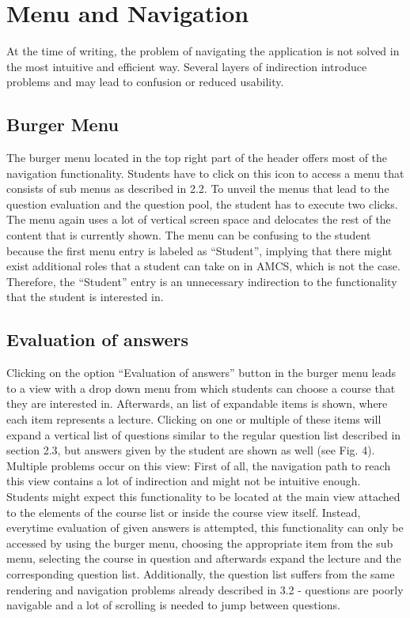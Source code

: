 \section{Menu and Navigation}

At the time of writing, the problem of navigating the application is not solved in the most intuitive and efficient way. Several layers of indirection introduce problems and may lead to confusion or reduced usability.

\subsection{Burger Menu}

The burger menu located in the top right part of the header offers most of the navigation functionality. Students have to click on this icon to access a menu that consists of sub menus as described in 2.2. To unveil the menus that lead to the question evaluation and the question pool, the student has to execute two clicks. The menu again uses a lot of vertical screen space and delocates the rest of the content that is currently shown.
The menu can be confusing to the student because the first menu entry is labeled as “Student”, implying that there might exist additional roles that a student can take on in AMCS, which is not the case. Therefore, the “Student” entry is an unnecessary indirection to the functionality that the student is interested in.

\subsection{Evaluation of answers}

Clicking on the option “Evaluation of answers” button in the burger menu leads to a view with a drop down menu from which students can choose a course that they are interested in. Afterwards, an list of expandable items is shown, where each item represents a lecture. Clicking on one or multiple of these items will expand a vertical list of questions similar to  the regular question list described in section 2.3, but answers given by the student are shown as well (see Fig. 4).
Multiple problems occur on this view: First of all, the navigation path to reach this view contains a lot of indirection and might not be intuitive enough. Students might expect this functionality to be located at the main view attached to the elements of the course list or inside the course view itself. Instead, everytime evaluation of given answers is attempted, this functionality can only be accessed by using the burger menu, choosing the appropriate item from the sub menu, selecting the course in question and afterwards expand the lecture and the corresponding question list.
Additionally, the question list suffers from the same rendering and navigation problems already described in 3.2 - questions are poorly navigable and a lot of scrolling is needed to jump between questions.

